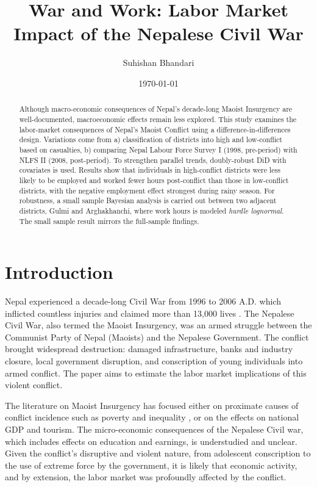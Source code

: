 \documentclass[12pt,a4paper]{article}
\begin{document}
	
\title{War and Work: Labor Market Impact of the Nepalese Civil War}

\author{Suhishan Bhandari}

\date{\today}

\maketitle
	
\begin{abstract}
	Although macro-economic consequences of Nepal's decade-long Maoist Insurgency are well-documented, macroeconomic effects remain less explored. This study examines the labor-market consequences of Nepal's Maoist Conflict using a difference-in-differences design. Variations come from a) classification of districts into high and low-conflict based on casualties, b) comparing Nepal Labour Force Survey I (1998, pre-period) with NLFS II (2008, post-period). To strengthen parallel trends, doubly-robust DiD with covariates is used. Results show that individuals in high-conflict districts were less likely to be employed and worked fewer hours post-conflict than those in low-conflict districts, with the negative employment effect strongest during rainy season. For robustness, a small sample Bayesian analysis is carried out between two adjacent districts, Gulmi and Arghakhanchi, where work hours is modeled \textit{hurdle lognormal}. The small sample result mirrors the full-sample findings.
	
	
\end{abstract}
	
	

\section{Introduction}
Nepal experienced a decade-long Civil War from 1996 to 2006 A.D. which inflicted countless injuries and claimed more than 13,000 lives \parencite{lawoti2009violent}. The Nepalese Civil War, also termed the Maoist Insurgency, was an armed struggle between the Communist Party of Nepal (Maoists) and the Nepalese Government. The conflict brought widespread destruction: damaged infrastructure, banks and industry closure, local government disruption, and conscription of young individuals into armed conflict. The paper aims to estimate the labor market implications of this violent conflict.

The literature on Maoist Insurgency has focused either on proximate causes of conflict incidence such as poverty and inequality \parencite{nepal2011more, do2010geography}, or on the effects on national GDP and tourism. The micro-economic consequences of the Nepalese Civil war, which includes effects on education and earnings, is understudied and unclear. Given the conflict's disruptive and violent nature, from adolescent conscription to the use of extreme force by the government, it is likely that economic activity, and by extension, the labor market was profoundly affected by the conflict.
\end{document}
